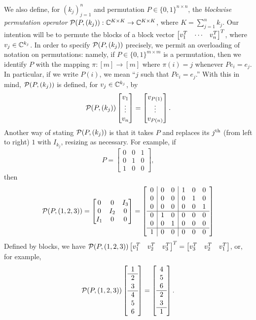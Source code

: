 We also define, for $(k_j)_{j = 1}^n$ and permutation $P \in \{0, 1\}^{n \times n}$, the \emph{blockwise permutation operator} $\mathcal{P}(P, (k_j)) : \mathbb{C}^{K \times K} \to \mathbb{C}^{K \times K}$, where $K = \sum_{j = 1}^n k_j$.  Our intention will be to permute the blocks of a block vector $\begin{bmatrix} v^T_{1} & \cdots & v^T_{n} \end{bmatrix}^T$, where $v_j \in \mathbb{C}^{k_j}$.  In order to specify $\mathcal{P}(P, (k_j))$ precisely, we permit an overloading of notation on permutations: namely, if $P \in \{0, 1\}^{m \times m}$ is a permutation, then we identify $P$ with the mapping $\pi : [m] \to [m]$ where $\pi(i) = j$ whenever $P e_i = e_j$.  In particular, if we write $P(i)$, we mean ``$j$ such that $P e_i = e_j$.''  With this in mind, $\mathcal{P}(P, (k_j))$ is defined, for $v_j \in \mathbb{C}^{k_j}$, by \begin{equation} \mathcal{P}(P, (k_j)) \begin{bmatrix} v_1 \\ \vdots \\ v_n \end{bmatrix} = \begin{bmatrix} v_{P(1)} \\ \vdots \\ v_{P(n)} \end{bmatrix}. \label{eq:block_perm} \end{equation}  Another way of stating $\mathcal{P}(P, (k_j))$ is that it takes $P$ and replaces its $j^{\text{th}}$ (from left to right) $1$ with $I_{k_j}$, resizing as necessary.  For example, if \[P = \begin{bmatrix} 0 & 0 & 1 \\ 0 & 1 & 0 \\ 1 & 0 & 0 \end{bmatrix},\] then
\[
  \mathcal{P}(P, (1, 2, 3)) = \begin{bmatrix} 0 & 0 & I_3 \\ 0 & I_2 & 0 \\ I_1 & 0 & 0 \end{bmatrix} = \left[\begin{array}{c|cc|ccc}
    0 & 0 & 0 & 1 & 0 & 0 \\
    0 & 0 & 0 & 0 & 1 & 0 \\
    0 & 0 & 0 & 0 & 0 & 1 \\ \hline
    0 & 1 & 0 & 0 & 0 & 0 \\
    0 & 0 & 1 & 0 & 0 & 0 \\ \hline
    1 & 0 & 0 & 0 & 0 & 0 \\
  \end{array}\right]
\]
Defined by blocks, we have $\mathcal{P}(P, (1, 2, 3)) \begin{bmatrix} v_1^T & v_2^T & v_3^T \end{bmatrix}^T = \begin{bmatrix} v_3^T & v_2^T & v_1^T \end{bmatrix}$, or, for example, \[\mathcal{P}(P, (1, 2, 3)) \left[\begin{array}{c} 1 \\ \hline 2 \\ 3 \\ \hline 4 \\ 5 \\ 6 \end{array}\right] = \left[\begin{array}{c} 4 \\ 5 \\ 6 \\ \hline 2 \\ 3 \\ \hline 1 \end{array}\right].\]

